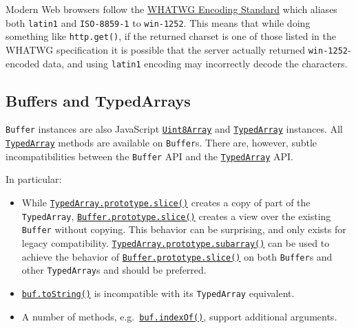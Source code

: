 Modern Web browsers follow the
\href{https://encoding.spec.whatwg.org/}{WHATWG Encoding Standard} which
aliases both \texttt{\textquotesingle{}latin1\textquotesingle{}} and
\texttt{\textquotesingle{}ISO-8859-1\textquotesingle{}} to
\texttt{\textquotesingle{}win-1252\textquotesingle{}}. This means that
while doing something like \texttt{http.get()}, if the returned charset
is one of those listed in the WHATWG specification it is possible that
the server actually returned
\texttt{\textquotesingle{}win-1252\textquotesingle{}}-encoded data, and
using \texttt{\textquotesingle{}latin1\textquotesingle{}} encoding may
incorrectly decode the characters.

\subsection{Buffers and TypedArrays}\label{buffers-and-typedarrays}

\texttt{Buffer} instances are also JavaScript
\href{https://developer.mozilla.org/en-US/docs/Web/JavaScript/Reference/Global_Objects/Uint8Array}{\texttt{Uint8Array}}
and
\href{https://developer.mozilla.org/en-US/docs/Web/JavaScript/Reference/Global_Objects/TypedArray}{\texttt{TypedArray}}
instances. All
\href{https://developer.mozilla.org/en-US/docs/Web/JavaScript/Reference/Global_Objects/TypedArray}{\texttt{TypedArray}}
methods are available on \texttt{Buffer}s. There are, however, subtle
incompatibilities between the \texttt{Buffer} API and the
\href{https://developer.mozilla.org/en-US/docs/Web/JavaScript/Reference/Global_Objects/TypedArray}{\texttt{TypedArray}}
API.

In particular:

\begin{itemize}
\tightlist
\item
  While
  \href{https://developer.mozilla.org/en-US/docs/Web/JavaScript/Reference/Global_Objects/TypedArray/slice}{\texttt{TypedArray.prototype.slice()}}
  creates a copy of part of the \texttt{TypedArray},
  \hyperref[bufslicestart-end]{\texttt{Buffer.prototype.slice()}}
  creates a view over the existing \texttt{Buffer} without copying. This
  behavior can be surprising, and only exists for legacy compatibility.
  \href{https://developer.mozilla.org/en-US/docs/Web/JavaScript/Reference/Global_Objects/TypedArray/subarray}{\texttt{TypedArray.prototype.subarray()}}
  can be used to achieve the behavior of
  \hyperref[bufslicestart-end]{\texttt{Buffer.prototype.slice()}} on
  both \texttt{Buffer}s and other \texttt{TypedArray}s and should be
  preferred.
\item
  \hyperref[buftostringencoding-start-end]{\texttt{buf.toString()}} is
  incompatible with its \texttt{TypedArray} equivalent.
\item
  A number of methods,
  e.g.~\hyperref[bufindexofvalue-byteoffset-encoding]{\texttt{buf.indexOf()}},
  support additional arguments.
\end{itemize}

